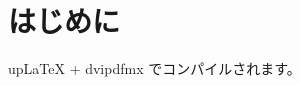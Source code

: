\documentclass[paper]{ieicej}
\begin{document}
\maketitle

\begin{abstract}
これは電子情報通信学会テンプレートの最小サンプルです。
取得した \texttt{ieicej.cls} のバージョンに合わせて調整してください。
\end{abstract}

\section{はじめに}
upLaTeX + dvipdfmx でコンパイルされます。
\end{document}
